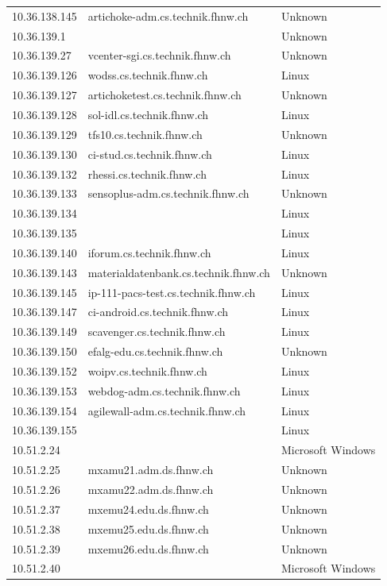 \documentclass[a4paper,11pt]{scrartcl}
\begin{document}
\begin{longtable}{p{2.5cm}|p{8cm}|l}
	10.36.138.145 & artichoke-adm.cs.technik.fhnw.ch & Unknown\\
	10.36.139.1 &  & Unknown\\
	10.36.139.27 & vcenter-sgi.cs.technik.fhnw.ch & Unknown\\
	10.36.139.126 & wodss.cs.technik.fhnw.ch & Linux\\
	10.36.139.127 & artichoketest.cs.technik.fhnw.ch & Unknown\\
	10.36.139.128 & sol-idl.cs.technik.fhnw.ch & Linux\\
	10.36.139.129 & tfs10.cs.technik.fhnw.ch & Unknown\\
	10.36.139.130 & ci-stud.cs.technik.fhnw.ch & Linux\\
	10.36.139.132 & rhessi.cs.technik.fhnw.ch & Linux\\
	10.36.139.133 & sensoplus-adm.cs.technik.fhnw.ch & Unknown\\
	10.36.139.134 &  & Linux\\
	10.36.139.135 &  & Linux\\
	10.36.139.140 & iforum.cs.technik.fhnw.ch & Linux\\
	10.36.139.143 & materialdatenbank.cs.technik.fhnw.ch & Unknown\\
	10.36.139.145 & ip-111-pacs-test.cs.technik.fhnw.ch & Linux\\
	10.36.139.147 & ci-android.cs.technik.fhnw.ch & Linux\\
	10.36.139.149 & scavenger.cs.technik.fhnw.ch & Linux\\
	10.36.139.150 & efalg-edu.cs.technik.fhnw.ch & Unknown\\
	10.36.139.152 & woipv.cs.technik.fhnw.ch & Linux\\
	10.36.139.153 & webdog-adm.cs.technik.fhnw.ch & Linux\\
	10.36.139.154 & agilewall-adm.cs.technik.fhnw.ch & Linux\\
	10.36.139.155 &  & Linux\\
	10.51.2.24 &  & Microsoft Windows\\
	10.51.2.25 & mxamu21.adm.ds.fhnw.ch & Unknown\\
	10.51.2.26 & mxamu22.adm.ds.fhnw.ch & Unknown\\
	10.51.2.37 & mxemu24.edu.ds.fhnw.ch & Unknown\\
	10.51.2.38 & mxemu25.edu.ds.fhnw.ch & Unknown\\
	10.51.2.39 & mxemu26.edu.ds.fhnw.ch & Unknown\\
	10.51.2.40 &  & Microsoft Windows\\

\end{longtable}
\end{document}
